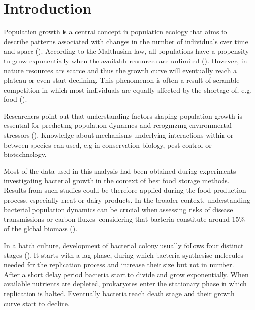 \documentclass[a4paper,11pt]{article}
\begin{document}
\section{Introduction}

Population growth is a central concept in population ecology that aims to describe patterns associated with changes in the number of individuals over time and space (\cite{krebs1985ecology}). According to the Malthusian law, all populations have a propensity to grow exponentially when the available resources are unlimited (\cite{krebs1985ecology}). However, in nature resources are scarce and thus the growth curve will eventually reach a plateau or even start declining. This phenomenon is often a result of scramble competition in which most individuals are equally affected by the shortage of, e.g. food (\cite{krebs1985ecology}).\par 

Researchers point out that understanding factors shaping population growth is essential for predicting population dynamics and recognizing environmental stressors (\cite{sibly2002population}). Knowledge about mechanisms underlying interactions within or between species can used, e.g in conservation biology, pest control or biotechnology.\par

Most of the data used in this analysis had been obtained during experiments investigating bacterial growth in the context of best food storage methods. Results from such studies could be therefore applied during the food production process, especially meat or dairy products. In the broader context, understanding bacterial population dynamics can be crucial when assessing risks of disease transmissions or carbon fluxes, considering that bacteria constitute around 15\% of the global biomass (\cite{bar2018biomass}).\par

In a batch culture, development of bacterial colony usually follows four distinct stages (\cite{peleg2011microbial}). It starts with a lag phase, during which bacteria synthesise molecules needed for the replication process and increase their size but not in number. After a short delay period bacteria start to divide and grow exponentially. When available nutrients are depleted, prokaryotes enter the stationary phase in which replication is halted. Eventually bacteria reach death stage and their growth curve start to decline. \par
\end{document}
